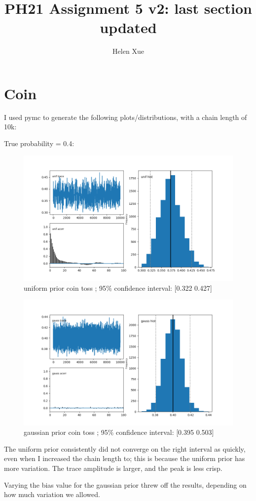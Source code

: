 \documentclass[a4paper,11pt,english]{article}
\title{PH21 Assignment 5 v2: last section updated}
\author{Helen Xue}
\begin{document}
\maketitle


\section{Coin}
\par I used pymc to generate the following plots/distributions, with a chain length of 10k:
\par True probability = 0.4:
\begin{figure}[H]

	\includegraphics[width=\linewidth]{coin/unif}
	uniform prior coin toss ;   95$\%$ confidence interval: [0.322 0.427]
	
	\includegraphics[width=\linewidth]{coin/gauss}
	gaussian prior coin toss ;  95$\%$ confidence interval: [0.395 0.503]
\end{figure}

\par The uniform prior consistently did not converge on the right interval as quickly, even when I increased the chain length to; this is because the uniform prior has more variation.  The trace amplitude is larger, and the peak is less crisp.
\par Varying the bias value for the gaussian prior threw off the results, depending on how much variation we allowed.
\end{document}
